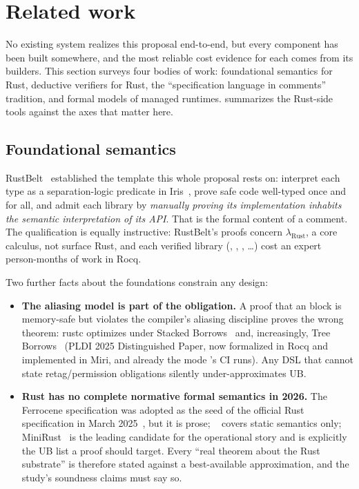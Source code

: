 \section{Related work}
\label{sec:prior-art}

No existing system realizes this proposal end-to-end, but every
component has been built somewhere, and the most reliable cost
evidence for each comes from its builders. This section surveys four
bodies of work: foundational semantics for  Rust, deductive verifiers
for Rust, the ``specification language in comments'' tradition, and formal
models of managed runtimes.  summarizes the Rust-side
tools against the axes that matter here.

\subsection{Foundational semantics}
\label{sec:prior-foundations}

RustBelt~\cite{rustbelt2018} established the template this whole proposal
rests on: interpret each type as a separation-logic predicate in
Iris~\cite{iris2018}, prove safe code well-typed once and for all, and
admit each  library by \emph{manually proving its
implementation inhabits the semantic interpretation of its API}. That is
the formal content of a \safetyc{} comment. The qualification is
equally instructive: RustBelt's proofs concern
$\lambda_{\mathrm{Rust}}$, a core calculus, not surface Rust, and each
verified library (, , , \dots) cost
an expert person-months of work in Rocq.

Two further facts about the foundations constrain any design:

\begin{itemize}[leftmargin=1.4em]
\item \textbf{The aliasing model is part of the obligation.} A proof that
  an  block is memory-safe but violates the compiler's
  aliasing discipline proves the wrong theorem: rustc optimizes under
  Stacked Borrows~\cite{stackedborrows2019} and, increasingly, Tree
  Borrows~\cite{treeborrows2025} (PLDI 2025 Distinguished Paper, now
  formalized in Rocq and implemented in Miri, and already the mode
  \dotnetrs{}'s CI runs). Any DSL that cannot state
  retag/permission obligations silently under-approximates UB.
\item \textbf{Rust has no complete normative formal semantics in 2026.}
  The Ferrocene specification was adopted as the seed of the official
  Rust specification in March 2025~\cite{fls2025}, but it is prose;
  ~\cite{amirformality} covers static semantics
  only; MiniRust~\cite{minirust} is the leading candidate for the
  operational story and is explicitly the UB list a proof should target.
  Every ``real theorem about the Rust substrate'' is therefore stated
  against a best-available approximation, and the study's soundness
  claims must say so.
\end{itemize}

